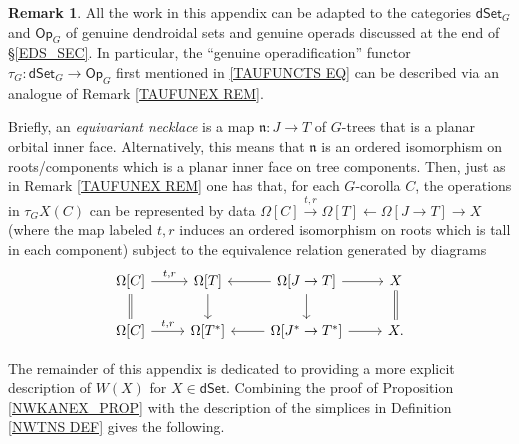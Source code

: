 \documentclass[a4paper,10pt
,draft
]{article}%
\numberwithin{equation}{section}
\numberwithin{figure}{section}
\theoremstyle{definition} %
\newtheorem{remark}[equation]{Remark}%
\newcommand{\1}{\ensuremath{\mathbbm 1}}%
\begin{document}
\begin{remark}\label{GTAUFUNEX REM}
	All the work in this appendix can be adapted to the categories
	$\mathsf{dSet}_G$ and $\mathsf{Op}_G$
	of genuine dendroidal sets and genuine operads
	discussed at the end of \S \ref{EDS_SEC}.
%	
	In particular, 
	the ``genuine operadification'' functor
	$\tau_G \colon \mathsf{dSet}_G \to \mathsf{Op}_G$
	first mentioned in
	\eqref{TAUFUNCTS EQ}
	can be described via an analogue of
	Remark \ref{TAUFUNEX REM}.
	
Briefly,
an \emph{equivariant necklace}
is a map $\mathfrak{n} \colon J \to T$ of $G$-trees
that is a planar orbital inner face.
Alternatively, this means that $\mathfrak{n}$
is an ordered isomorphism on roots/components which is a planar inner face on tree components. 
%
Then, just as in Remark \ref{TAUFUNEX REM}
one has that, for each $G$-corolla $C$,
the operations in 
$\tau_G X(C)$
can be represented by data
$\Omega[C] \xrightarrow{t,r}
\Omega[T] \leftarrow
\Omega[J \to T] \to 
X$
(where the map labeled $t,r$ induces an ordered isomorphism on roots which is tall in each component)
subject to the equivalence relation generated by diagrams
\[
\begin{tikzcd}
\Omega[C] \ar{r}{t,r} \ar[equal]{d} &
\Omega[T] \ar{d} &
\Omega[J \to T] \ar{l} \ar{r} \ar{d} &
X \ar[equal]{d}
\\
\Omega[C] \ar{r}{t,r} &
\Omega[T^{\**}] &
\Omega[J^{\**} \to T^{\**}] \ar{l} \ar{r} &
X.
\end{tikzcd}
\]

\end{remark}




The remainder of this appendix is dedicated to providing a more explicit description of $W(X)$ for $X \in \mathsf{dSet}$.
%
Combining the proof of Proposition \ref{NWKANEX_PROP}
with the description of the simplices 
in Definition \ref{NWTNS DEF} gives the following.
\end{document}
